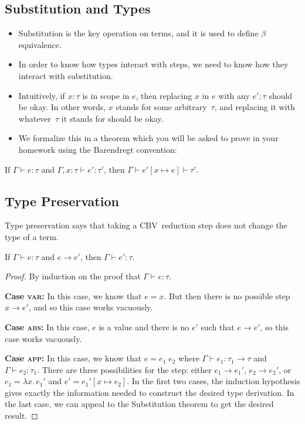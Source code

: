 \documentclass{lecturenotes}
\newcommand{\abs}[2]{\ensuremath{\lambda #1.\,#2}}
\newcommand{\app}[2]{\ensuremath{#1\;#2}}
\begin{document}
\subsection{Substitution and Types}
\label{sec:substitution-types}

\begin{itemize}
\item Substitution is the key operation on terms, and it is used to define $\beta$ equivalence.
\item In order to know how types interact with steps, we need to know how they interact with substitution.
\item Intuitively, if $x \colon \tau$ is in scope in $e$, then replacing $x$ in $e$ with any $e' \colon \tau$ should be okay.
  In other words, $x$ stands for some arbitrary~$\tau$, and replacing it with whatever~$\tau$ it stands for should be okay.
\item We formalize this in a theorem which you will be asked to prove in your homework using the Barendregt convention:
\end{itemize}
\begin{thm}[Substitution]
  If $\Gamma \vdash e \colon \tau$ and $\Gamma, x \colon \tau \vdash e' \colon \tau'$, then $\Gamma \vdash e'[x \mapsto e] \vdash \tau'$.
\end{thm}

\subsection{Type Preservation}
\label{sec:type-preservation}

Type preservation says that taking a CBV~reduction step does not change the type of a term.

\begin{thm}[Preservation]
  If $\Gamma \vdash e \colon \tau$ and $e \to e'$, then $\Gamma \vdash e' \colon \tau$.
\end{thm}
\begin{proof}
  By induction on the proof that $\Gamma \vdash e \colon \tau$.

  \noindent\textbf{Case \textsc{var}:}
  In this case, we know that $e = x$.
  But then there is no possible step $x \to e'$, and so this case works vacuously.

  \noindent\textbf{Case \textsc{abs}:}
  In this case, $e$ is a value and there is no $e'$ such that $e \to e'$, so this case works vacuously.

  \noindent\textbf{Case \textsc{app}:}
  In this case, we know that $e = \app{e_1}{e_2}$ where $\Gamma \vdash e_1 \colon \tau_1 \to \tau$ and $\Gamma \vdash e_2 \colon \tau_1$.
  There are three possibilities for the step: either $e_1 \to e_1'$, $e_2 \to e_2'$, or $e_1 = \abs{x}{e_1'}$ and $e' = e_1'[x \mapsto e_2]$.
  In the first two cases, the induction hypothesis gives exactly the information needed to construct the desired type derivation.
  In the last case, we can appeal to the Substitution theorem to get the desired result.
\end{proof}
\end{document}
